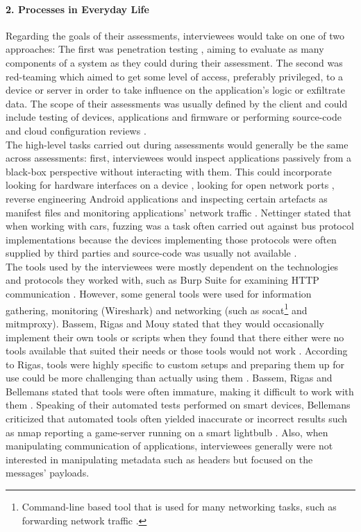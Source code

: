 \paragraph{2. Processes in Everyday Life} Regarding the goals of their assessments, interviewees would take on one of two approaches: The first was penetration testing \cite{eisenschmidt_2020,bassem_2020,rigas_2020}, aiming to evaluate as many components of a system as they could during their assessment. The second was red-teaming \cite{nettinger_2020,mouy_2020,bassem_2020,rigas_2020} which aimed to get some level of access, preferably privileged, to a device or server in order to take influence on the application's logic or exfiltrate data. The scope of their assessments was usually defined by the client and could include testing of devices, applications and firmware or performing source-code and cloud configuration reviews \cite{eisenschmidt_2020}.\\
The high-level tasks carried out during assessments would generally be the same across assessments: first, interviewees would inspect applications passively from a black-box perspective without interacting with them. This could incorporate looking for hardware interfaces on a device \cite{bassem_2020,rigas_2020}, looking for open network ports \cite{bellemans_2020}, reverse engineering Android applications and inspecting certain artefacts as manifest files \cite{eisenschmidt_2020} and monitoring applications' network traffic \cite{bellemans_2020}. Nettinger stated that when working with cars, fuzzing was a task often carried out against bus protocol implementations because the devices implementing those protocols were often supplied by third parties and source-code was usually not available \cite{nettinger_2020}.\\
The tools used by the interviewees were mostly dependent on the technologies and protocols they worked with, such as Burp Suite for examining \ac{HTTP} communication \cite{eisenschmidt_2020,bassem_2020,rigas_2020,nettinger_2020,mouy_2020,bellemans_2020}. However, some general tools were used for information gathering, monitoring (Wireshark) and networking (such as socat\footnote{Command-line based tool that is used for many networking tasks, such as forwarding network traffic \cite{socat}.} and mitmproxy). Bassem, Rigas and Mouy stated that they would occasionally implement their own tools or scripts when they found that there either were no tools available that suited their needs or those tools would not work \cite{bassem_2020,rigas_2020,mouy_2020}. According to Rigas, tools were highly specific to custom setups and preparing them up for use could be more challenging than actually using them \cite{rigas_2020}. Bassem, Rigas and Bellemans stated that tools were often immature, making it difficult to work with them \cite{bassem_2020,rigas_2020,bellemans_2020}. Speaking of their automated tests performed on smart devices, Bellemans criticized that automated tools often yielded inaccurate or incorrect results such as nmap reporting a game-server running on a smart lightbulb \cite{bellemans_2020}. Also, when manipulating communication of applications, interviewees generally were not interested in manipulating metadata such as headers but focused on the messages' payloads.

